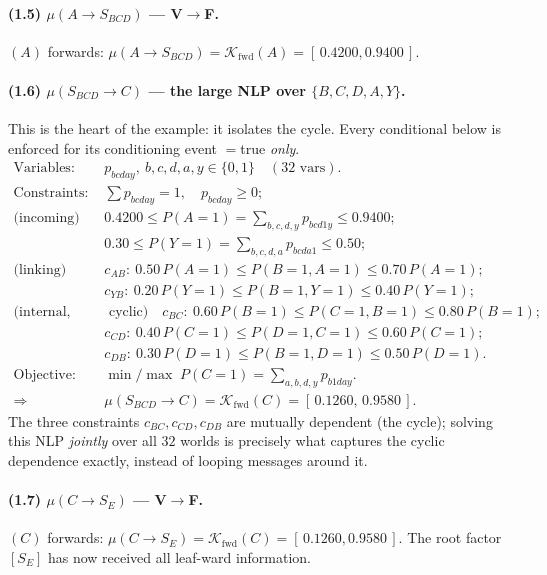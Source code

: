 \documentclass[11pt]{article}
\newcommand{\cK}{\mathcal{K}}
\newcommand{\fwd}{\mathrm{fwd}}
\begin{document}
\paragraph{(1.5) $\mu(A\!\to\!S_{BCD})$ --- V$\to$F.}
$(A)$ forwards: $\mu(A\!\to\!S_{BCD})=\cK_\fwd(A)=[\,0.4200,0.9400\,]$.

\paragraph{(1.6) $\mu(S_{BCD}\!\to\!C)$ --- the large NLP over $\{B,C,D,A,Y\}$.}
This is the heart of the example: it isolates the cycle. Every conditional
below is enforced for its conditioning event $={}$true \emph{only}.
\begin{align*}
  \text{Variables: } & p_{bcday},\ b,c,d,a,y\in\{0,1\}\quad(32\text{ vars}).\\
  \text{Constraints: } & \textstyle\sum p_{bcday}=1,\quad p_{bcday}\ge0;\\
   \text{(incoming)}\;& 0.4200 \le P(A{=}1)=\!\!\sum_{b,c,d,y}\!\!p_{bcd1y} \le 0.9400; \\
                      & 0.30 \le P(Y{=}1)=\!\!\sum_{b,c,d,a}\!\!p_{bcda1} \le 0.50; \\
   \text{(linking)}\;& c_{AB}:\ 0.50\,P(A{=}1)\!\le\! P(B{=}1,A{=}1)\!\le\! 0.70\,P(A{=}1);\\
                      & c_{YB}:\ 0.20\,P(Y{=}1)\!\le\! P(B{=}1,Y{=}1)\!\le\! 0.40\,P(Y{=}1);\\
   \text{(internal,}&\text{ cyclic)}\quad
                      c_{BC}:\ 0.60\,P(B{=}1)\le P(C{=}1,B{=}1)\le 0.80\,P(B{=}1);\\
                      & c_{CD}:\ 0.40\,P(C{=}1)\le P(D{=}1,C{=}1)\le 0.60\,P(C{=}1);\\
                      & c_{DB}:\ 0.30\,P(D{=}1)\le P(B{=}1,D{=}1)\le 0.50\,P(D{=}1).\\
  \text{Objective: } & \min/\max\; P(C{=}1)=\!\!\sum_{a,b,d,y}\!\!p_{b1day}.\\
  \Rightarrow\;& \mu(S_{BCD}\!\to\!C)=\cK_\fwd(C)=[\,0.1260,\,0.9580\,].
\end{align*}
The three constraints $c_{BC},c_{CD},c_{DB}$ are mutually dependent (the
cycle); solving this NLP \emph{jointly} over all $32$ worlds is precisely what
captures the cyclic dependence exactly, instead of looping messages around it.

\paragraph{(1.7) $\mu(C\!\to\!S_E)$ --- V$\to$F.}
$(C)$ forwards: $\mu(C\!\to\!S_E)=\cK_\fwd(C)=[\,0.1260,0.9580\,]$. The
root factor $[S_E]$ has now received all leaf-ward information.
\end{document}

